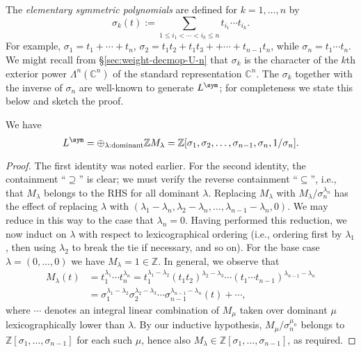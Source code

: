 \documentclass[reqno]{amsart} 
\begin{document}
The \emph{elementary symmetric polynomials} are defined for $k=1,\dotsc,n$ by
\begin{equation*}
  \sigma_k(t) := \sum_{1 \leq i_1 < \dotsb < i_k \leq n} t_{i_1} \dotsb t_{i_k}.
\end{equation*}
For example, $\sigma_1 = t_1 + \dotsb + t_n$, $\sigma_2 = t_1 t_2 + t_1 t_3 + + \dotsb + t_{n-1} t_n$, while $\sigma_n = t_1 \dotsb t_n$.  We might recall from \S\ref{sec:weight-decmop-U-n} that $\sigma_k$ is the character of the $k$th exterior power $\Lambda^n(\mathbb{C}^n)$ of the standard representation $\mathbb{C}^n$.  The $\sigma_k$ together with the inverse of $\sigma_n$ are well-known to generate $L^{\sym}$; for completeness we state this below and sketch the proof.
\begin{lemma}\label{lem:symmetric-functino-theory}
  We have
  \begin{equation*}
    L^{\sym} = \oplus _{\lambda:\text{dominant}} \mathbb{Z} M_\lambda = \mathbb{Z}[\sigma_1,\sigma_2,\dotsc,\sigma_{n-1},\sigma_n,1/\sigma_n].
  \end{equation*}
\end{lemma}
\begin{proof}
  The first identity was noted earlier.  For the second identity, the containment ``$\supseteq$'' is clear; we must verify the reverse containment ``$\subseteq$'', i.e., that $M_\lambda$ belongs to the RHS for all dominant $\lambda$.  Replacing $M_\lambda$ with $M_\lambda/\sigma_n^{\lambda_n}$ has the effect of replacing $\lambda$ with $(\lambda_1 - \lambda_n, \lambda_2 - \lambda_n, \dotsc, \lambda_{n-1} - \lambda_n, 0)$.  We may reduce in this way to the case that $\lambda_n = 0$.  Having performed this reduction, we now induct on $\lambda$ with respect to lexicographical ordering (i.e., ordering first by $\lambda_1$, then using $\lambda_2$ to break the tie if necessary, and so on).  For the base case $\lambda = (0,\dotsc,0)$ we have $M_\lambda = 1 \in \mathbb{Z}$.  In general, we observe that
  \begin{align*}
    M_\lambda(t)
    &= t_1^{\lambda_1} \dotsb t_n^{\lambda_n}
      = t_1^{\lambda_1 - \lambda_2}
      (t_1 t_2)^{\lambda_2 - \lambda_3}
      \dotsb (t_1 \dotsb t_{n-1})^{\lambda_{n-1} - \lambda_n} \\
    &= \sigma_1^{\lambda_1 - \lambda_2}
      \sigma_2^{\lambda_2 - \lambda_3} \dotsb
      \sigma_{n-1}^{\lambda_{n-1} - \lambda_n}
      (t)
      + \dotsb,
  \end{align*}
  where $\dotsb$ denotes an integral linear combination of $M_{\mu}$ taken over dominant $\mu$ lexicographically lower than $\lambda$.  By our inductive hypothesis, $M_{\mu}/\sigma_n^{\mu_n}$ belongs to $\mathbb{Z}[\sigma_1,\dotsc,\sigma_{n-1}]$ for each such $\mu$, hence also $M_{\lambda} \in \mathbb{Z}[\sigma_1,\dotsc,\sigma_{n-1}]$, as required.
\end{proof}
\end{document}
